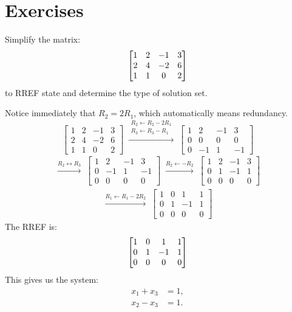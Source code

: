 \section*{Exercises} %
\begin{Exercise}[title=Augmented Matrix 1, label=infinitelymany]
Simplify the matrix:
$$\begin{bmatrix} 
1&2&-1&3\\
2&4&-2&6\\
1&1&0&2 \end{bmatrix}$$
to RREF state and determine the type of solution set.
\end{Exercise}
\begin{Answer}[ref=infinitelymany]
Notice immediately that $R_2 = 2R_1$, which automatically means redundancy. 
$$\begin{bmatrix}
1&2&-1&3\\
2&4&-2&6\\
1&1&0&2
\end{bmatrix}
\;\xrightarrow{\substack{R_2\leftarrow R_2-2R_1\\ R_3\leftarrow R_3-R_1}}\;
\begin{bmatrix}
1&2&-1&3\\
0&0&0&0\\
0&-1&1&-1
\end{bmatrix}$$
$$\begin{array}{c} \xrightarrow{R_2\leftrightarrow R_3}\;
\begin{bmatrix}
1&2&-1&3\\
0&-1&1&-1\\
0&0&0&0
\end{bmatrix}
\;\xrightarrow{R_2\leftarrow -R_2}\;
\begin{bmatrix}
1&2&-1&3\\
0&1&-1&1\\
0&0&0&0
\end{bmatrix} \end{array}$$
$$\begin{array}{c} \xrightarrow{R_1\leftarrow R_1-2R_2}\;
\boxed{
\begin{bmatrix}
1&0&1&1\\
0&1&-1&1\\
0&0&0&0
\end{bmatrix}} \end{array}$$
The RREF is:
$$\begin{bmatrix} 
1&0&1&1\\
0&1&-1&1\\
0&0&0&0 \end{bmatrix}$$
This gives us the system:
$$\begin{aligned}
x_1 + x_3 &= 1,\\
x_2 - x_3 &= 1.
\end{aligned}$$

\end{Answer}
